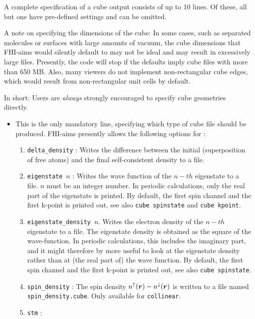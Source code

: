 A complete specification of a cube output consists of up to 10 lines. Of
these, all but one have pre-defined settings and can be omitted. 

A note on specifying the dimensions of the cube: In some cases, such
as separated molecules or surfaces with large amounts of vacuum, the
cube dimensions that FHI-aims would silently default to may not be 
ideal and may result in excessively large files.  Presently, the code
will stop if the defaults imply cube files with more than 650
MB. Also, many viewers do not implement non-rectangular cube edges,
which would result from non-rectangular unit cells by default.

In short: Users are \emph{always} strongly encouraged to specify cube
geometries directly. 

\begin{itemize}
\item {}  
This is the only mandatory line, specifying which type of cube file should be produced. 
FHI-aims presently allows the following options for : 
\begin{enumerate}
  \item \texttt{delta\_density} : Writes the difference between the
    initial (superposition of free atoms) and the final
    self-consistent density to a file.
  \item \texttt{eigenstate $n$} :  Writes the wave function of the
    $n-th$ eigenstate to a file. $n$ must  
    be an integer number. In periodic calculations, only the real part
    of the eigenstate is printed. By default, the first spin channel and the
    first k-point is printed out, see also \texttt{cube spinstate} and \texttt{cube kpoint}.
  \item \texttt{eigenstate\_density $n$}. Writes the electron density
   of the $n-th$ eigenstate to a file. The eigenstate density is 
   obtained as the square of the wave-function. In periodic calculations, this
   includes the imaginary part, and it might therefore by more useful to look
   at the eigenstate density rather than at (the real part of) the wave function.
   By default, the first spin channel and the first k-point is printed out, see also 
   \texttt{cube spinstate}.
  \item \texttt{spin\_density} : The spin density $n^\uparrow(\mbox{\boldmath$r$})
    - n^\downarrow(\mbox{\boldmath$r$})$ is written to a file named
    \texttt{spin\_density.cube}. Only available for 
    \texttt{collinear}.
  \item \texttt{stm} :

\end{enumerate}
\end{itemize}
